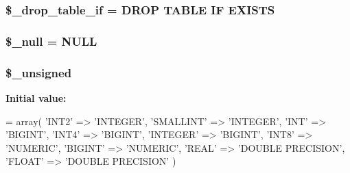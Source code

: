 \subsubsection[{\$\+\_\+drop\+\_\+table\+\_\+if}]{\setlength{\rightskip}{0pt plus 5cm}\$\+\_\+drop\+\_\+table\+\_\+if = \textquotesingle{}D\+R\+O\+P T\+A\+B\+L\+E I\+F E\+X\+I\+S\+T\+S\textquotesingle{}\hspace{0.3cm}{\ttfamily [protected]}}\label{class_c_i___d_b__pdo__pgsql__forge_a92a8a9145a7fc91e252e58d019373581}
\hypertarget{class_c_i___d_b__pdo__pgsql__forge_ae58fe6a5104d4a069a49b27533ce808f}{}
\subsubsection[{\$\+\_\+null}]{\setlength{\rightskip}{0pt plus 5cm}\$\+\_\+null = \textquotesingle{}N\+U\+L\+L\textquotesingle{}\hspace{0.3cm}{\ttfamily [protected]}}\label{class_c_i___d_b__pdo__pgsql__forge_ae58fe6a5104d4a069a49b27533ce808f}
\hypertarget{class_c_i___d_b__pdo__pgsql__forge_aae977ae6d61fa183f0b25422b6ddc31c}{}
\subsubsection[{\$\+\_\+unsigned}]{\setlength{\rightskip}{0pt plus 5cm}\$\+\_\+unsigned\hspace{0.3cm}{\ttfamily [protected]}}\label{class_c_i___d_b__pdo__pgsql__forge_aae977ae6d61fa183f0b25422b6ddc31c}
{\bfseries Initial value\+:}
\begin{DoxyCode}
= array(
        \textcolor{stringliteral}{'INT2'}      => \textcolor{stringliteral}{'INTEGER'},
        \textcolor{stringliteral}{'SMALLINT'}  => \textcolor{stringliteral}{'INTEGER'},
        \textcolor{stringliteral}{'INT'}       => \textcolor{stringliteral}{'BIGINT'},
        \textcolor{stringliteral}{'INT4'}      => \textcolor{stringliteral}{'BIGINT'},
        \textcolor{stringliteral}{'INTEGER'}   => \textcolor{stringliteral}{'BIGINT'},
        \textcolor{stringliteral}{'INT8'}      => \textcolor{stringliteral}{'NUMERIC'},
        \textcolor{stringliteral}{'BIGINT'}    => \textcolor{stringliteral}{'NUMERIC'},
        \textcolor{stringliteral}{'REAL'}      => \textcolor{stringliteral}{'DOUBLE PRECISION'},
        \textcolor{stringliteral}{'FLOAT'}     => \textcolor{stringliteral}{'DOUBLE PRECISION'}
    )
\end{DoxyCode}


